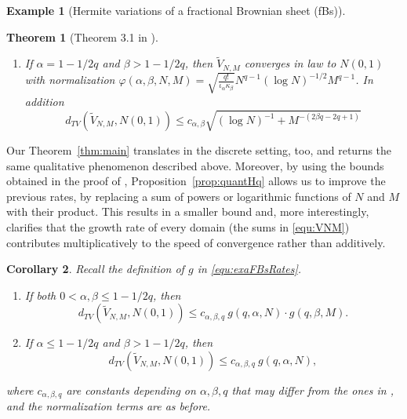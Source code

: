 \documentclass[12pt]{article}
\DeclareMathOperator{\1}{1}
\renewcommand{\phi}{\varphi}
\theoremstyle{plain}
\newtheorem{theorem}{Theorem}
\newtheorem{corollary}[theorem]{Corollary}
\theoremstyle{definition}
\newtheorem{example}{Example}
\begin{document}
\begin{example}[Hermite variations of a fractional Brownian sheet (fBs)]
\begin{theorem}[Theorem 3.1 in \cite{RST}]
\begin{enumerate}[label=(\arabic*)]
\begin{equation}
                    d_{TV}(\widetilde V_{N,M},N(0,1)) 
                    \le c_{\alpha,\beta}\sqrt{N^{-1} + N^{2\alpha-2}+N^{2\alpha q -2q +1}+M^{\color{red}{-(2\beta q -2q +1)}}}.
                    \end{equation}
                \item If $\alpha=1-1/2q$ and $\beta>1-1/2q$, then $\widetilde V_{N,M}$ converges in law to $N(0,1)$ with normalization $\phi(\alpha,\beta,N,M)=\sqrt{\frac{q!}{\iota_{\alpha}\kappa_{\beta}}} N^{ q - 1} (\log N)^{-1/2} M^{ q - 1}$. In addition \begin{equation}
                    d_{TV}(\widetilde V_{N,M},N(0,1)) 
                    \le c_{\alpha,\beta}\sqrt{(\log N)^{-1}+M^{-(2\beta q -2q +1)}}
                    \end{equation} 
            \end{enumerate}            
        \end{theorem}
        
        Our Theorem~\ref{thm:main} translates in the discrete setting, too, and returns the same qualitative phenomenon described above. Moreover, by using the bounds obtained in the proof of \cite[Theorem 4.1]{NP09}, Proposition~\ref{prop:quantHq} allows us to improve the previous rates, {by replacing a sum of powers or logarithmic functions of $N$ and $M$ with their product. This results in a smaller bound and, more interestingly, clarifies that the growth rate of every domain (the sums in \eqref{equ:VNM}) contributes multiplicatively to the speed of convergence rather than additively. }
        \begin{corollary}\label{co:exaFBsBounds} Recall the definition of $g$ in \eqref{equ:exaFBsRates}. 
        \begin{enumerate}[label=(\arabic*)]
            \item If both $0<\alpha,\beta\leq 1-1/2q$, then \begin{equation}
                d_{TV}(\widetilde V_{N,M},N(0,1))  \le c_{\alpha,\beta,q} \ g(q,\alpha,N) \cdot g(q,\beta,M).
            \end{equation}
            \item If $\alpha\leq 1-1/2q$ and $\beta>1-1/2q$, then \begin{equation}
                d_{TV}(\widetilde V_{N,M},N(0,1))  \le c_{\alpha,\beta,q} \ g(q,\alpha,N),
            \end{equation}
        \end{enumerate}
        where $c_{\alpha,\beta,q}$ are constants depending on $\alpha,\beta,q$ that may differ from the ones in \cite[Theorem 3.1]{RST}, and the normalization terms are as before.
        \end{corollary}
       
\end{example}
\end{document}
